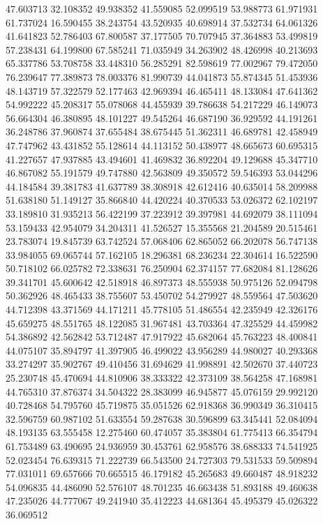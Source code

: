 47.603713
32.108352
49.938352
41.559085
52.099519
53.988773
61.971931
61.737024
16.590455
38.243754
43.520935
40.698914
37.532734
64.061326
41.641823
52.786403
67.800587
37.177505
70.707945
37.364883
53.499819
57.238431
64.199800
67.585241
71.035949
34.263902
48.426998
40.213693
65.337786
53.708758
33.448310
56.285291
82.598619
77.002967
79.472050
76.239647
77.389873
78.003376
81.990739
44.041873
55.874345
51.453936
48.143719
57.322579
52.177463
42.969394
46.465411
48.133084
47.641362
54.992222
45.208317
55.078068
44.455939
39.786638
54.217229
46.149073
56.664304
46.380895
48.101227
49.545264
46.687190
36.929592
44.191261
36.248786
37.960874
37.655484
38.675445
51.362311
46.689781
42.458949
47.747962
43.431852
55.128614
44.113152
50.438977
48.665673
60.695315
41.227657
47.937885
43.494601
41.469832
36.892204
49.129688
45.347710
46.867082
55.191579
49.747880
42.563809
49.350572
59.546393
53.044296
44.184584
39.381783
41.637789
38.308918
42.612416
40.635014
58.209988
51.638180
51.149127
35.866840
44.420224
40.370533
53.026372
62.102197
33.189810
31.935213
56.422199
37.223912
39.397981
44.692079
38.111094
53.159433
42.954079
34.204311
41.526527
15.355568
21.204589
20.515461
23.783074
19.845739
63.742524
57.068406
62.865052
66.202078
56.747138
33.984055
69.065744
57.162105
18.296381
68.236234
22.304614
16.522590
50.718102
66.025782
72.338631
76.250904
62.374157
77.682084
81.128626
39.341701
45.600642
42.518918
46.897373
48.555938
50.975126
52.094798
50.362926
48.465433
38.755607
53.450702
54.279927
48.559564
47.503620
44.712398
43.371569
44.171211
45.778105
51.486554
42.235949
42.326176
45.659275
48.551765
48.122085
31.967481
43.703364
47.325529
44.459982
54.386892
42.562842
53.712487
47.917922
45.682064
45.763223
48.400841
44.075107
35.894797
41.397905
46.499022
43.956289
44.980027
40.293368
33.274297
35.902767
49.410456
31.694629
41.998891
42.502670
37.440723
25.230748
45.470694
44.810906
38.333322
42.373109
38.564258
47.168981
44.765310
37.876374
34.504322
28.383099
46.945877
45.076159
29.992120
40.728468
54.795760
45.719875
35.051526
62.918368
36.990349
36.310415
32.596759
60.987102
51.633554
59.287638
30.596899
63.345441
52.084094
48.193135
63.555458
12.275460
60.474057
35.383804
61.775413
66.354794
61.753489
63.490695
24.936959
30.453761
62.958576
38.688333
74.541925
52.023454
76.639315
71.222739
66.543500
24.727303
79.531533
59.509894
77.031011
69.657666
70.665515
46.179182
45.265683
49.660487
48.918232
54.096835
44.486090
52.576107
48.701235
46.663438
51.893188
49.460638
47.235026
44.777067
49.241940
35.412223
44.681364
45.495379
45.026322
36.069512
